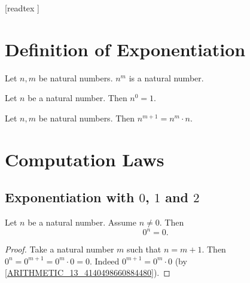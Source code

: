 \documentclass[10pt]{article}
\begin{document}
  \begin{imports}
    \begin{forthel}
      [readtex ]
    \end{forthel}
  \end{imports}


  \section{Definition of Exponentiation}

  \begin{forthel}
    \begin{signature}
      Let $n, m$ be natural numbers.
      $n^{m}$ is a natural number.
    \end{signature}
  \end{forthel}

  \begin{forthel}
    \begin{axiom}
      Let $n$ be a natural number.
      Then $n^{0} = 1$.
    \end{axiom}
  \end{forthel}

  \begin{forthel}
    \begin{axiom}
      Let $n, m$ be natural numbers.
      Then $n^{m + 1} = n^{m} \cdot n$.
    \end{axiom}
  \end{forthel}


  \section{Computation Laws}

  \subsection{Exponentiation with $0$, $1$ and $2$}

  \begin{forthel}
    \begin{proposition}
      Let $n$ be a natural number.
      Assume $n \neq 0$.
      Then \[ 0^{n} = 0. \]
    \end{proposition}
    \begin{proof}
      Take a natural number $m$ such that $n = m + 1$.
      Then $0^{n}
        = 0^{m + 1}
        = 0^{m} \cdot 0
        = 0$.
      Indeed $0^{m + 1} = 0^{m} \cdot 0$ (by \cref{ARITHMETIC_13_4140498660884480}).
    \end{proof}
  \end{forthel}
\end{document}
